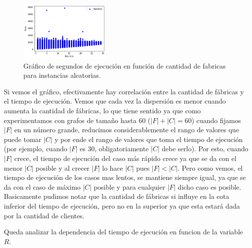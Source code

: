 \documentclass[A4paper,oneside,fleqn,11pt]{article}
\theoremstyle{definition}
\begin{document}
\begin{figure}
\centering
\includegraphics[width=0.4\textwidth]{noDepFabricas.png}
\caption{ Gráfico de segundos de ejecución en función de cantidad de fabricas para instancias aleatorias.}
\end{figure}

Si vemos el gráfico, efectivamente hay correlación entre la cantidad de fábricas y el tiempo de ejecución. Vemos que cada vez la dispersión es menor cuando aumenta la cantidad de fábricas, lo que tiene sentido ya que como experimentamos con grafos de tamaño hasta $60$ ($|F|+|C|=60$) cuando fijamos $|F|$ en un número grande, reducimos considerablemente el rango de valores que puede tomar $|C|$ y por ende el rango de valores que toma el tiempo de ejecución (por ejemplo, cuando $|F|$ es 30, obligatoriamente $|C|$ debe serlo). Por esto, cuando $|F|$ crece, el tiempo de ejecución del caso más rápido crece ya que se da con el menor $|C|$ posible y al crecer $|F|$ lo hace $|C|$ pues $|F|<|C|$. Pero como vemos, el tiempo de ejecución de los casos mas lentos, se mantiene siempre igual, ya que se da con el caso de máximo $|C|$ posible y para cualquier $|F|$ dicho caso es posible. Basicamente pudimos notar que la cantidad de fábricas si influye en la cota inferior del tiempo de ejecución, pero no en la superior ya que esta estará dada por la cantidad de clientes.	



Queda analizar la dependencia del tiempo de ejecución en funcion de la variable $R$.
\end{document}
